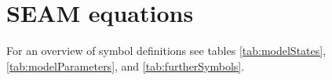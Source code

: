 \section{SEAM equations \label{app:SEAM}}    

For an overview of symbol definitions see tables \ref{tab:modelStates},
\ref{tab:modelParameters}, and \ref{tab:furtherSymbols}.


